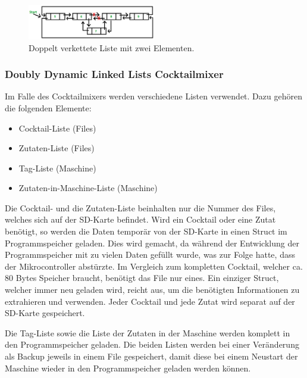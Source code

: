 \begin{figure}[h!]
	\centering
	\includegraphics[width=0.5\textwidth]{graphics/Doubly_Linked_List_2_3}
	\caption{Doppelt verkettete Liste mit zwei Elementen.}
	\label{fig:Doubly_Linked_List_2_3}
\end{figure}


\subsubsection{Doubly Dynamic Linked Lists Cocktailmixer}

Im Falle des Cocktailmixers werden verschiedene Listen verwendet. Dazu gehören die folgenden Elemente:

\begin{itemize}
\item Cocktail-Liste (Files)
\item Zutaten-Liste (Files)
\item Tag-Liste (Maschine)
\item Zutaten-in-Maschine-Liste (Maschine)
\end{itemize}

Die Cocktail- und die Zutaten-Liste beinhalten nur die Nummer des Files, welches sich auf der SD-Karte befindet. Wird ein Cocktail oder eine Zutat benötigt, so werden die Daten temporär von der SD-Karte in einen Struct im Programmspeicher geladen. Dies wird gemacht, da während der Entwicklung der Programmspeicher mit zu vielen Daten gefüllt wurde, was zur Folge hatte, dass der Mikrocontroller abstürzte. Im Vergleich zum kompletten Cocktail, welcher ca. 80 Bytes Speicher braucht, benötigt das File nur eines. Ein einziger Struct, welcher immer neu geladen wird, reicht aus, um die benötigten Informationen zu extrahieren und verwenden. Jeder Cocktail und jede Zutat wird separat auf der SD-Karte gespeichert.

Die Tag-Liste sowie die Liste der Zutaten in der Maschine werden komplett in den Programmspeicher geladen. Die beiden Listen werden bei einer Veränderung als Backup jeweils in einem File gespeichert, damit diese bei einem Neustart der Maschine wieder in den Programmspeicher geladen werden können.